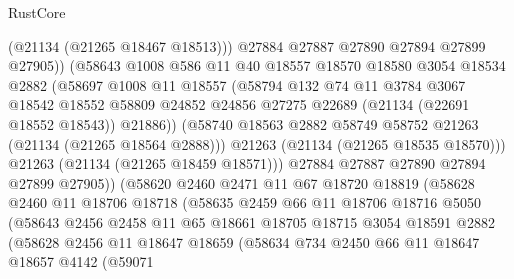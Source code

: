 \begin{lexlean}{RustCore}
\begin{coremodule}
                        (@21134 (@21265 @18467 @18513)))
                      @27884
                      @27887
                      @27890
                      @27894
                      @27899
                      @27905))
                  (@58643
                    @1008
                    @586
                    @11
                    @40
                    @18557
                    @18570
                    @18580
                    @3054
                    @18534
                    @2882
                    (@58697
                      @1008
                      @11
                      @18557
                      (@58794
                        @132
                        @74
                        @11
                        @3784
                        @3067
                        @18542
                        @18552
                        @58809
                        @24852
                        @24856
                        @27275
                        @22689
                        (@21134 (@22691 @18552 @18543))
                        @21886))
                    (@58740 @18563 @2882 @58749 @58752 @21263 (@21134 (@21265 @18564 @2888)))
                    @21263
                    (@21134 (@21265 @18535 @18570)))
                  @21263
                  (@21134 (@21265 @18459 @18571)))
                @27884
                @27887
                @27890
                @27894
                @27899
                @27905))
            (@58620
              @2460
              @2471
              @11
              @67
              @18720
              @18819
              (@58628
                @2460
                @11
                @18706
                @18718
                (@58635
                  @2459
                  @66
                  @11
                  @18706
                  @18716
                  @5050
                  (@58643
                    @2456
                    @2458
                    @11
                    @65
                    @18661
                    @18705
                    @18715
                    @3054
                    @18591
                    @2882
                    (@58628
                      @2456
                      @11
                      @18647
                      @18659
                      (@58634
                        @734
                        @2450
                        @66
                        @11
                        @18647
                        @18657
                        @4142
                        (@59071

\end{coremodule}
\end{lexlean}
